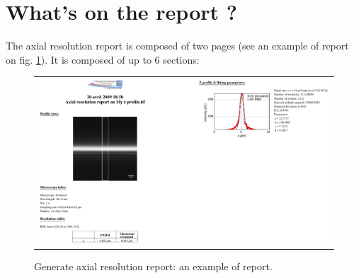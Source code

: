\documentclass[a4paper, 11pt]{report}%
\begin{document}
\section{What's on the report ?}
\label{sec:garr-rep}

The axial resolution report is composed of two pages (see an example of report on fig. \ref{fig:garr-report}). It is composed of up to 6 sections:
\begin{figure}[!ht]
		\begin{center}
		\begin{tabular}{c}
			\includegraphics[width=\linewidth]{img/garr-report}
		\end{tabular}
	\end{center}
	\caption{\label{fig:garr-report}Generate axial resolution report: an example of report.}
\end{figure} 
\end{document}
